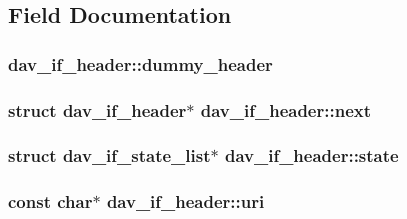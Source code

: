 \subsection{Field Documentation}
\subsubsection[{\texorpdfstring{dummy\+\_\+header}{dummy_header}}]{ dav\+\_\+if\+\_\+header\+::dummy\+\_\+header}\hypertarget{structdav__if__header_af664db521e06b3271803b9dc447e73c3}{}\label{structdav__if__header_af664db521e06b3271803b9dc447e73c3}
\subsubsection[{\texorpdfstring{next}{next}}]{\setlength{\rightskip}{0pt plus 5cm}struct {\bf dav\+\_\+if\+\_\+header}$\ast$ dav\+\_\+if\+\_\+header\+::next}\hypertarget{structdav__if__header_a8692a3d4d3ba871236222dc47db84480}{}\label{structdav__if__header_a8692a3d4d3ba871236222dc47db84480}
\subsubsection[{\texorpdfstring{state}{state}}]{\setlength{\rightskip}{0pt plus 5cm}struct {\bf dav\+\_\+if\+\_\+state\+\_\+list}$\ast$ dav\+\_\+if\+\_\+header\+::state}\hypertarget{structdav__if__header_a207b17a4d7ca0ac1140041d503adcdad}{}\label{structdav__if__header_a207b17a4d7ca0ac1140041d503adcdad}
\subsubsection[{\texorpdfstring{uri}{uri}}]{\setlength{\rightskip}{0pt plus 5cm}const char$\ast$ dav\+\_\+if\+\_\+header\+::uri}\hypertarget{structdav__if__header_a39fd578ebb057f1790391b4b6046a829}{}\label{structdav__if__header_a39fd578ebb057f1790391b4b6046a829}
